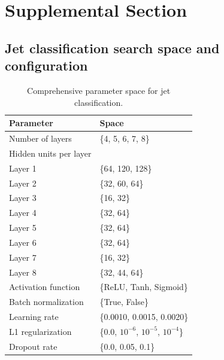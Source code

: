 \documentclass[11pt]{article}
\begin{document}
\newpage
\appendix
\section{Supplemental Section}

\subsection{Jet classification search space and configuration}
\label{app:jet-search-config}

\begin{table}[H]
  \caption{Comprehensive parameter space for jet classification.}
  \label{tab:mlp-parameter-table}
  \centering
  \small
  \renewcommand{\arraystretch}{1.2}
  \begin{tabular}{ll}
    \toprule
    \textbf{Parameter} & \textbf{Space} \\
    \midrule
    Number of layers        & \{4, 5, 6, 7, 8\} \\
    Hidden units per layer  & \\
    \quad Layer 1 & \{64, 120, 128\} \\
    \quad Layer 2 & \{32, 60, 64\} \\
    \quad Layer 3 & \{16, 32\} \\
    \quad Layer 4 & \{32, 64\} \\
    \quad Layer 5 & \{32, 64\} \\
    \quad Layer 6 & \{32, 64\} \\
    \quad Layer 7 & \{16, 32\} \\
    \quad Layer 8 & \{32, 44, 64\} \\
    Activation function     & \{ReLU, Tanh, Sigmoid\} \\
    Batch normalization     & \{True, False\} \\
    Learning rate           & \{0.0010, 0.0015, 0.0020\} \\
    L1 regularization       & \{0.0, $10^{-6}$, $10^{-5}$, $10^{-4}$\} \\
    Dropout rate            & \{0.0, 0.05, 0.1\} \\
    \bottomrule
  \end{tabular}
\end{table}
\end{document}

